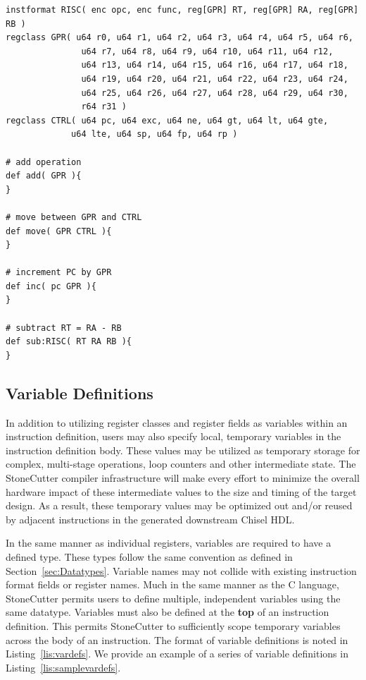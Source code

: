\documentclass{article}
\begin{document}
\clearpage
\vspace{0.125in}
\begin{lstlisting}[frame=single,style=base,caption={Instruction Prototype Format},captionpos=b,label={lis:instprototype}]
instformat RISC( enc opc, enc func, reg[GPR] RT, reg[GPR] RA, reg[GPR] RB )
regclass GPR( u64 r0, u64 r1, u64 r2, u64 r3, u64 r4, u64 r5, u64 r6, 
		       u64 r7, u64 r8, u64 r9, u64 r10, u64 r11, u64 r12, 
		       u64 r13, u64 r14, u64 r15, u64 r16, u64 r17, u64 r18,
		       u64 r19, u64 r20, u64 r21, u64 r22, u64 r23, u64 r24, 
		       u64 r25, u64 r26, u64 r27, u64 r28, u64 r29, u64 r30,
		       r64 r31 )
regclass CTRL( u64 pc, u64 exc, u64 ne, u64 gt, u64 lt, u64 gte,
			 u64 lte, u64 sp, u64 fp, u64 rp )

# add operation			 
def add( GPR ){
}

# move between GPR and CTRL 
def move( GPR CTRL ){
}

# increment PC by GPR
def inc( pc GPR ){
}

# subtract RT = RA - RB
def sub:RISC( RT RA RB ){
}
\end{lstlisting}

\clearpage
\subsection{Variable Definitions}
\label{sec:Variable Definitions}

In addition to utilizing register classes and register fields as variables within 
an instruction definition, users may also specify local, temporary variables 
in the instruction definition body.  These values may be utilized as temporary 
storage for complex, multi-stage operations, loop counters and other intermediate 
state.  The StoneCutter compiler infrastructure will make every effort to minimize the overall 
hardware impact of these intermediate values to the size and timing of the target design.  As a result, 
these temporary values may be optimized out and/or reused by adjacent instructions 
in the generated downstream Chisel HDL.  

In the same manner as individual registers, variables are required to have a defined type.  
These types follow the same convention as defined in Section~\ref{sec:Datatypes}.  Variable 
names may not collide with existing instruction format fields or register names.  Much in the same 
manner as the C language, StoneCutter permits users to define multiple, independent variables 
using the same datatype.  Variables must also be defined at the \textbf{top} of an instruction 
definition.  This permits StoneCutter to sufficiently scope temporary variables across the body 
of an instruction.  The format of 
variable definitions is noted in Listing~\ref{lis:vardefs}.  We provide an example of a series of 
variable definitions in Listing~\ref{lis:samplevardefs}.  
\end{document}
